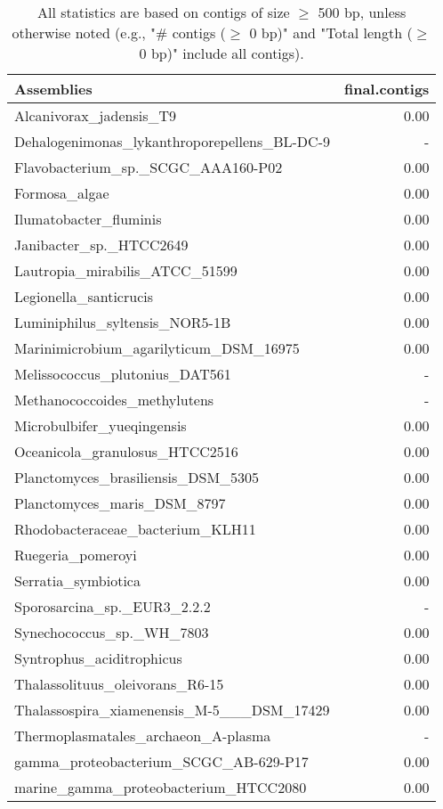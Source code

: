 \documentclass[12pt,a4paper]{article}
\begin{document}
\begin{table}[ht]
\begin{center}
\caption{All statistics are based on contigs of size $\geq$ 500 bp, unless otherwise noted (e.g., "\# contigs ($\geq$ 0 bp)" and "Total length ($\geq$ 0 bp)" include all contigs).}
\begin{tabular}{|l*{1}{|r}|}
\hline
Assemblies & final.contigs \\ \hline
Alcanivorax\_jadensis\_T9 & 0.00 \\ \hline
Dehalogenimonas\_lykanthroporepellens\_BL-DC-9 & - \\ \hline
Flavobacterium\_sp.\_SCGC\_AAA160-P02 & 0.00 \\ \hline
Formosa\_algae & 0.00 \\ \hline
Ilumatobacter\_fluminis & 0.00 \\ \hline
Janibacter\_sp.\_HTCC2649 & 0.00 \\ \hline
Lautropia\_mirabilis\_ATCC\_51599 & 0.00 \\ \hline
Legionella\_santicrucis & 0.00 \\ \hline
Luminiphilus\_syltensis\_NOR5-1B & 0.00 \\ \hline
Marinimicrobium\_agarilyticum\_DSM\_16975 & 0.00 \\ \hline
Melissococcus\_plutonius\_DAT561 & - \\ \hline
Methanococcoides\_methylutens & - \\ \hline
Microbulbifer\_yueqingensis & 0.00 \\ \hline
Oceanicola\_granulosus\_HTCC2516 & 0.00 \\ \hline
Planctomyces\_brasiliensis\_DSM\_5305 & 0.00 \\ \hline
Planctomyces\_maris\_DSM\_8797 & 0.00 \\ \hline
Rhodobacteraceae\_bacterium\_KLH11 & 0.00 \\ \hline
Ruegeria\_pomeroyi & 0.00 \\ \hline
Serratia\_symbiotica & 0.00 \\ \hline
Sporosarcina\_sp.\_EUR3\_2.2.2 & - \\ \hline
Synechococcus\_sp.\_WH\_7803 & 0.00 \\ \hline
Syntrophus\_aciditrophicus & 0.00 \\ \hline
Thalassolituus\_oleivorans\_R6-15 & 0.00 \\ \hline
Thalassospira\_xiamenensis\_M-5\_\_\_DSM\_17429 & 0.00 \\ \hline
Thermoplasmatales\_archaeon\_A-plasma & - \\ \hline
gamma\_proteobacterium\_SCGC\_AB-629-P17 & 0.00 \\ \hline
marine\_gamma\_proteobacterium\_HTCC2080 & 0.00 \\ \hline
\end{tabular}
\end{center}
\end{table}
\end{document}
